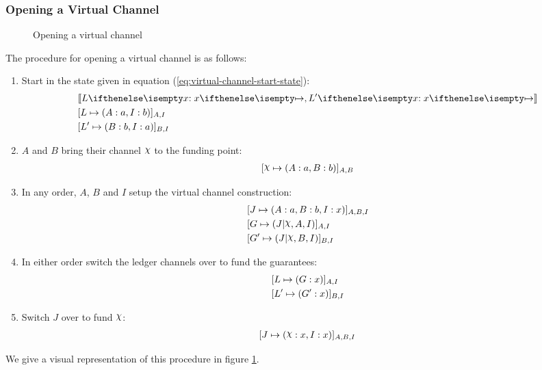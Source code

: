\subsubsection{Opening a Virtual Channel}

\begin{figure}[ht] \centering
  \makebox[\textwidth][c]{}
  \caption{Opening a virtual channel}
  \label{fig:virtual-channel-opening}
\end{figure}

The procedure for opening a virtual channel is as follows:
\begin{enumerate}
  \item Start in the state given in equation (\ref{eq:virtual-channel-start-state}):
  \begin{align}
    & \adj{\holds{L}{x}{}, \holds{L'}{x}{}}\\
    & \finalizable{L}{\alloc{A:a, I:b}}{A, I} \\
    & \finalizable{L'}{\alloc{B: b, I: a}}{B, I}
  \end{align}
  \item $A$ and $B$ bring their channel $\rchi$ to the funding point:
  \begin{align}
    \finalizable{\rchi}{\alloc{A:a, B:b}}{A,B}
  \end{align}
  \item In any order, $A$, $B$ and $I$ setup the virtual channel construction:
  \begin{align}
    & \finalizable{J}{\alloc{A:a, B:b, I: x}}{A, B, I} \\
    & \finalizable{G}{\guar{J}{\rchi, A, I}}{A, I} \\
    & \finalizable{G'}{\guar{J}{\rchi, B, I}}{B, I}
  \end{align}
  \item In either order switch the ledger channels over to fund the guarantees:
  \begin{align}
    & [L \mapsto ( G: x )]_{A,I} \\
    & [L' \mapsto ( G': x )]_{B,I}
  \end{align}
  \item Switch $J$ over to fund $\rchi$:
  \begin{align}
    \finalizable{J}{\alloc{\rchi: x, I: x}}{A, B, I}
  \end{align}
\end{enumerate}
We give a visual representation of this procedure in figure \ref{fig:virtual-channel-opening}.

